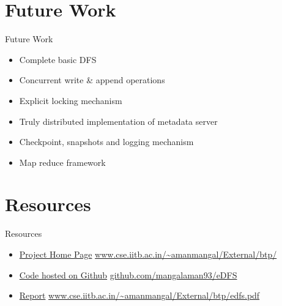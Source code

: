 \documentclass{beamer}
\begin{document}
\section{Future Work}
\begin{frame}{Future Work}
\begin{itemize}
\item Complete basic DFS
\item Concurrent write \& append operations
\item Explicit locking mechanism
\item Truly distributed implementation of metadata server
\item Checkpoint, snapshots and logging mechanism
\item Map reduce framework
\end{itemize}
\end{frame}


\section{Resources}
\begin{frame}{Resources}
\begin{itemize}
\item \href{http://www.cse.iitb.ac.in/~amanmangal/External/btp/}{Project Home Page} \url{www.cse.iitb.ac.in/~amanmangal/External/btp/}
\item \href{https://github.com/mangalaman93/eDFS}{Code hosted on Github} \url{github.com/mangalaman93/eDFS}
\item \href{http://www.cse.iitb.ac.in/~amanmangal/External/btp/edfs.pdf}{Report} \url{www.cse.iitb.ac.in/~amanmangal/External/btp/edfs.pdf}
\end{itemize}
\end{frame}
\end{document}
